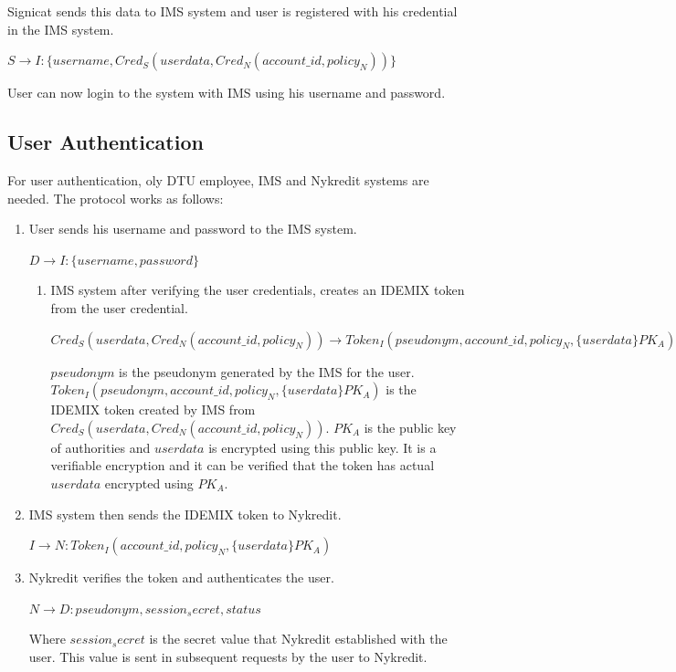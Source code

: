 \begin{enumerate}
Signicat sends this data to IMS system and user is registered with his credential in the IMS system.
\begin{center}
	$S \rightarrow I : \{username,Cred_S(userdata,Cred_N(account\_id,policy_N))\}$
\end{center}
User can now login to the system with IMS using his username and password.
\end{enumerate}

\subsection{User Authentication}
For user authentication, oly DTU employee, IMS and Nykredit systems are needed. The protocol works as follows:
\begin{enumerate}
	\item User sends his username and password to the IMS system.
	\begin{center}
		$D \rightarrow I : \{username,password\}$
	\end{center}
	\begin{enumerate}
	\item IMS system after verifying the user credentials, creates an IDEMIX token from the user credential.
	\begin{center}
		$Cred_S(userdata,Cred_N(account\_id,policy_N)) \rightarrow Token_I(pseudonym,account\_id,policy_N,\{userdata\}PK_A)$
	\end{center}
	$pseudonym$ is the pseudonym generated by the IMS for the user. $Token_I(pseudonym,account\_id,policy_N,\{userdata\}PK_A)$ is the IDEMIX token created by IMS from $Cred_S(userdata,Cred_N(account\_id,policy_N))$. $PK_A$ is the public key of authorities and $userdata$ is encrypted using this public key. It is a verifiable encryption and it can be verified that the token has actual $userdata$ encrypted using $PK_A$.
	\end{enumerate}
	\item IMS system then sends the IDEMIX token to Nykredit. 
	\begin{center}
		$I \rightarrow N : Token_I(account\_id,policy_N,\{userdata\}PK_A)$
	\end{center}
	\item Nykredit verifies the token and authenticates the user.
	\begin{center}
		$N \rightarrow D : {pseudonym,session_secret,status}$
	\end{center}
	Where $session_secret$ is the secret value that Nykredit established with the user. This value is sent in subsequent requests by the user to Nykredit.
\end{enumerate}
